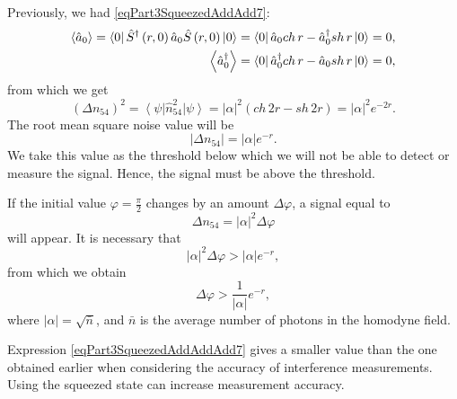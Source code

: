 Previously, we had \eqref{eqPart3SqueezedAddAdd7}:
\begin{eqnarray}
\left<\hat{a}_0\right> = 
\bra{0}
\hat{S}^{\dag}\left(r, 0\right)
\hat{a}_0
\hat{S}\left(r, 0\right)
\ket{0} = 
\bra{0}
\hat{a}_0 ch\,r - \hat{a}_0^{\dag} sh\,r
\ket{0} = 0,
\nonumber \\
\left<\hat{a}_0^{\dag}\right> = 
\bra{0}
\hat{a}_0^{\dag} ch\,r - \hat{a}_0 sh\,r
\ket{0} = 0,
\nonumber
\end{eqnarray}
from which we get
\begin{equation}
\left(\Delta n_{54}\right)^2 = 
\left<\psi\right|\hat{n}_{54}^2\left|\psi\right> =
\left|\alpha\right|^2\left(
ch\,2r - sh\,2r
\right) = 
\left|\alpha\right|^2 e^{-2 r}.
\nonumber
\end{equation}
The root mean square noise value will be 
\[
\left|\Delta n_{54}\right| = 
\left|\alpha\right| e^{- r}.
\]
We take this value as the threshold below which we will not be able to
detect or measure the signal. Hence, the signal must be
above the threshold.

If the initial value $\varphi=\frac{\pi}{2}$ changes by an amount $\Delta
\varphi$, a signal equal to
\[
\Delta n_{54} = 
\left|\alpha\right|^2
\Delta \varphi
\]
will appear.
It is necessary that 
\[
\left|\alpha\right|^2
\Delta \varphi > 
\left|\alpha\right|
e^{-r},
\]
from which we obtain
\begin{equation}
\Delta \varphi >
\frac{1}{\left|\alpha\right|} e^{-r},
\label{eqPart3SqueezedAddAddAdd7}
\end{equation}
where $\left|\alpha\right| = \sqrt{\bar{n}}$, and $\bar{n}$ is the average number
of photons in the homodyne field.

Expression \eqref{eqPart3SqueezedAddAddAdd7} gives a smaller value than
the one obtained earlier when considering the accuracy of interference
measurements. Using the squeezed state can increase measurement
accuracy. 

